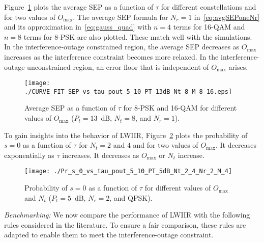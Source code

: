 \documentclass[journal]{IEEEtran}
\newcommand{\nx}{{0}}
\newcommand{\Nt}{{N_t}}
\newcommand{\Nr}{{N_r}}
\newcommand{\Pt}{{P_t}}
\newcommand{\outmax}{O_{\text{max}}}
\newcommand{\itau}{\tau}
\begin{document}
Figure~\ref{fig:SEP_vs_tau_QAM} plots the average SEP as a function of  $\itau$ for different constellations and for two values of $\outmax$. The average SEP formula for $\Nr=1$ in~\eqref{eq:avgSEPoneNr} and its approximation in~\eqref{eq:gauss_quad} with $n=4$ terms for 16-QAM and $n=8$ terms for 8-PSK are also plotted. These match well with the simulations. In the interference-outage constrained region, the average SEP decreases as $\outmax$ increases as the interference constraint becomes more relaxed. In the interference-outage unconstrained region, an error floor that is  independent of $\outmax$ arises.  
%
\begin{figure}
	\centering \texttt{[image: ./CURVE\_FIT\_SEP\_vs\_tau\_pout\_5\_10\_PT\_13dB\_Nt\_8\_M\_8\_16.eps]}
	\caption{Average SEP as a function of $\itau$ for 8-PSK and 16-QAM for different values of $\outmax$ ($\Pt = 13$~dB, $\Nt=8$, and $\Nr=1$).}
	\label{fig:SEP_vs_tau_QAM}
\end{figure}


To gain insights into the behavior of LWIIR,   Figure~\ref{fig:Pr_s_0_vs_tau} plots the probability of $s=0$ as a function of $\itau$ for $\Nt=2$ and $4$ and for two values of $\outmax$. It decreases exponentially as $\itau$  increases. It decreases as $\outmax$ or $\Nt$ increase. 
\begin{figure}
\centering
\texttt{[image: ./Pr\_s\_0\_vs\_tau\_pout\_5\_10\_PT\_5dB\_Nt\_2\_4\_Nr\_2\_M\_4]}
\caption{Probability of $s=\nx$ as a function of $\tau$ for different values of $\outmax$ and $\Nt$ ($\Pt = 5$~dB, $\Nr=2$, and QPSK).}
\label{fig:Pr_s_0_vs_tau}
\end{figure}



{\em Benchmarking:} We now compare the performance of LWIIR with the following rules considered in the literature. To ensure a fair comparison, these rules are adapted to enable them to meet the interference-outage constraint. 

\newcommand{\aicconst}{\nu}
\newcommand{\emiconst}{\beta}
\newcommand{\emslirconst}{\eta}
\newcommand{\epicconst}{\xi}
\newcommand{\enset}{{\cal{W}}}
\end{document}
